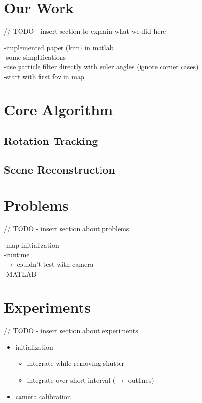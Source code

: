 \documentclass[10pt,twocolumn,letterpaper]{article}
\begin{document}


\section{Our Work}

// TODO - insert section to explain what we did here

-implemented paper (kim) in matlab\\
-some simplifications\\
	-use particle filter directly with euler angles (ignore corner cases)\\
	-start with first fov in map\\
	
\section{Core Algorithm}



\subsection{Rotation Tracking}



\subsection{Scene Reconstruction}



\section{Problems}

// TODO - insert section about problems

-map initialization\\
-runtime\\
$\rightarrow$ couldn't test with camera\\
-MATLAB\\


\section{Experiments}

// TODO - insert section about experiments

\begin{itemize}
\item initialization
\begin{itemize}
\item integrate while removing shutter
\item integrate over short interval ($\rightarrow$ outlines)
\end{itemize}
\item camera calibration
\end{itemize}
\end{document}
